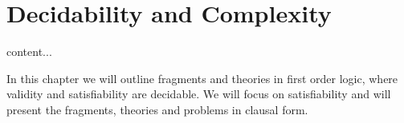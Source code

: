 
\chapter{Decidability and Complexity}

\begin{theorem}
	content...
\end{theorem}



In this chapter we will outline fragments and theories in first order logic, 
where validity and satisfiability are decidable. 
We will focus on satisfiability and will present the fragments, theories and problems in clausal form.






